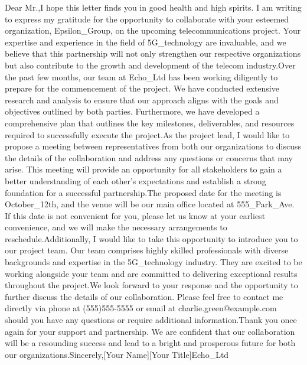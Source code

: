 Dear Mr.,I hope this letter finds you in good health and high spirits. I am writing to express my gratitude for the opportunity to collaborate with your esteemed organization, Epsilon_Group, on the upcoming telecommunications project. Your expertise and experience in the field of 5G_technology are invaluable, and we believe that this partnership will not only strengthen our respective organizations but also contribute to the growth and development of the telecom industry.Over the past few months, our team at Echo_Ltd has been working diligently to prepare for the commencement of the project. We have conducted extensive research and analysis to ensure that our approach aligns with the goals and objectives outlined by both parties. Furthermore, we have developed a comprehensive plan that outlines the key milestones, deliverables, and resources required to successfully execute the project.As the project lead, I would like to propose a meeting between representatives from both our organizations to discuss the details of the collaboration and address any questions or concerns that may arise. This meeting will provide an opportunity for all stakeholders to gain a better understanding of each other's expectations and establish a strong foundation for a successful partnership.The proposed date for the meeting is October_12th, and the venue will be our main office located at 555_Park_Ave. If this date is not convenient for you, please let us know at your earliest convenience, and we will make the necessary arrangements to reschedule.Additionally, I would like to take this opportunity to introduce you to our project team. Our team comprises highly skilled professionals with diverse backgrounds and expertise in the 5G_technology industry. They are excited to be working alongside your team and are committed to delivering exceptional results throughout the project.We look forward to your response and the opportunity to further discuss the details of our collaboration. Please feel free to contact me directly via phone at (555)555-5555 or email at charlie.green@example.com should you have any questions or require additional information.Thank you once again for your support and partnership. We are confident that our collaboration will be a resounding success and lead to a bright and prosperous future for both our organizations.Sincerely,[Your Name][Your Title]Echo_Ltd